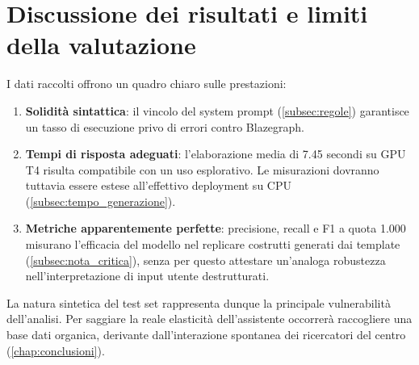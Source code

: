 \section{Discussione dei risultati e limiti della valutazione}\label{sec:discussione}

I dati raccolti offrono un quadro chiaro sulle prestazioni:

\begin{enumerate}
    \item \textbf{Solidità sintattica}: il vincolo del system prompt (\cref{subsec:regole}) garantisce un tasso di esecuzione privo di errori contro Blazegraph.
    \item \textbf{Tempi di risposta adeguati}: l'elaborazione media di 7.45 secondi su GPU T4 risulta compatibile con un uso esplorativo. Le misurazioni dovranno tuttavia essere estese all'effettivo deployment su CPU (\cref{subsec:tempo_generazione}).
    \item \textbf{Metriche apparentemente perfette}: precisione, recall e F1 a quota 1.000 misurano l'efficacia del modello nel replicare costrutti generati dai template (\cref{subsec:nota_critica}), senza per questo attestare un'analoga robustezza nell'interpretazione di input utente destrutturati.
\end{enumerate}

La natura sintetica del test set rappresenta dunque la principale vulnerabilità dell'analisi. Per saggiare la reale elasticità dell'assistente occorrerà raccogliere una base dati organica, derivante dall'interazione spontanea dei ricercatori del centro (\cref{chap:conclusioni}).